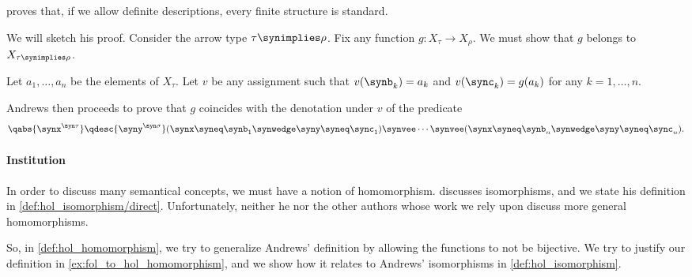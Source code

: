 \begin{remark}
\begin{thmenum}
     \Textcite[thm. 5404]{Andrews2002Logic} proves that, if we allow definite descriptions, every finite structure is standard.

    We will sketch his proof. Consider the arrow type \( \tau \synimplies \rho \). Fix any function \( g: X_\tau \to X_\rho \). We must show that \( g \) belongs to \( X_{\tau \synimplies \rho} \).

    Let \( a_1, \ldots, a_n \) be the elements of \( X_\tau \). Let \( v \) be any assignment such that \( v(\synb_k) = a_k \) and \( v(\sync_k) = g(a_k) \) for any \( k = 1, \ldots, n \).

    Andrews then proceeds to prove that \( g \) coincides with the denotation under \( v \) of the predicate
    \begin{equation*}
      \qabs {\synx^{\syn\tau}} \qdesc {\syny^{\syn\sigma}} (\synx \syneq \synb_1 \synwedge \syny \syneq \sync_1) \synvee \cdots \synvee (\synx \syneq \synb_n \synwedge \syny \syneq \sync_n).
    \end{equation*}
  \end{thmenum}
\end{remark}

\paragraph{Institution}

\begin{remark}\label{rem:def:hol_homomorphism}
  In order to discuss many semantical concepts, we must have a notion of homomorphism. \Textcite[245]{Andrews2002Logic} discusses isomorphisms, and we state his definition in \cref{def:hol_isomorphism/direct}. Unfortunately, neither he nor the other authors whose work we rely upon discuss more general homomorphisms.

  So, in \cref{def:hol_homomorphism}, we try to generalize Andrews' definition by allowing the functions to not be bijective. We try to justify our definition in \cref{ex:fol_to_hol_homomorphism}, and we show how it relates to Andrews' isomorphisms in \cref{def:hol_isomorphism}.
\end{remark}

